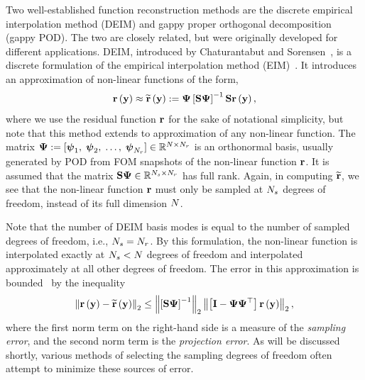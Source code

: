 Two well-established function reconstruction methods are the discrete empirical interpolation method (DEIM) and gappy proper orthogonal decomposition (gappy POD). The two are closely related, but were originally developed for different applications. DEIM, introduced by Chaturantabut and Sorensen~\cite{Chaturantabut2010}, is a discrete formulation of the empirical interpolation method (EIM)~\cite{Barrault2004}. It introduces an approximation of non-linear functions of the form,
%
\begin{equation}\label{eq:deimRHSApprox}
    \resFunc{\dummyVec} \approx \resApproxFunc{\dummyVec} \defEq \deimBasis \left[ \sampMat \deimBasis \right]^{-1} \sampMat \resFunc{\dummyVec},
\end{equation}
%
where we use the residual function $\mathbf{r}$ for the sake of notational simplicity, but note that this method extends to approximation of any non-linear function. The matrix $\deimBasis \defEq [\deimBasisVec_1, \; \deimBasisVec_2, \; \hdots, \; \deimBasisVec_{\numResModes}] \inRTwo{\numDOF}{\numResModes}$ is an orthonormal basis, usually generated by POD from FOM snapshots of the non-linear function $\mathbf{r}$. It is assumed that the matrix $\sampMat \deimBasis \inRTwo{\numSamps}{\numResModes}$ has full rank. Again, in computing $\mathbf{\widetilde{r}}$, we see that the non-linear function $\mathbf{r}$ must only be sampled at $N_s$ degrees of freedom, instead of its full dimension $N$.

Note that the number of DEIM basis modes is equal to the number of sampled degrees of freedom, i.e., $N_s = N_r$. By this formulation, the non-linear function is interpolated exactly at $N_s < N$ degrees of freedom and interpolated approximately at all other degrees of freedom. The error in this approximation is bounded~\cite{Chaturantabut2010} by the inequality
%
\begin{equation}\label{eq:deimErrorBound}
   \left\Vert \resFunc{\dummyVec} - \resApproxFunc{\dummyVec} \right\Vert_2 \le \left\Vert \left[ \sampMat \deimBasis \right]^{-1} \right\Vert_2 \left\Vert \left[ \identMat - \deimBasis \deimBasis^\top \right] \resFunc{\dummyVec} \right\Vert_2,
\end{equation}
%
where the first norm term on the right-hand side is a measure of the \textit{sampling error}, and the second norm term is the \textit{projection error}. As will be discussed shortly, various methods of selecting the sampling degrees of freedom often attempt to minimize these sources of error.

